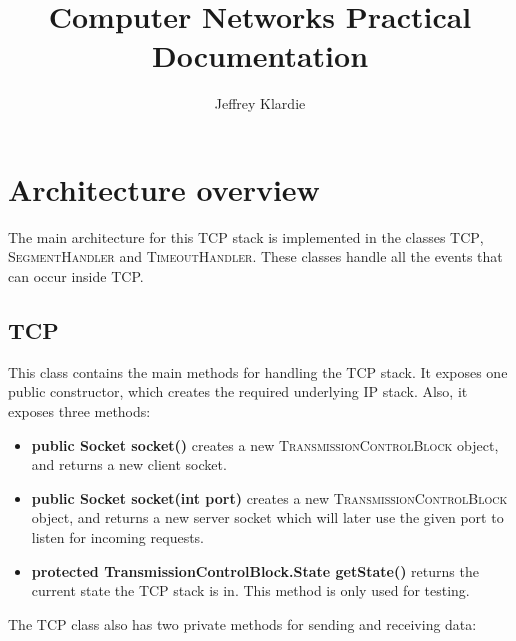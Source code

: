 \documentclass{hitec}
\title{Computer Networks Practical Documentation}
\author{Jeffrey Klardie}
\newcommand{\classname}[1]{\textsc{#1}}
\begin{document}
\maketitle

\section{Architecture overview}
The main architecture for this TCP stack is implemented in the classes \classname{TCP}, \classname{SegmentHandler} and \classname{TimeoutHandler}. These classes handle all the events that can occur inside TCP.

\subsection{TCP}
This class contains the main methods for handling the TCP stack. It exposes one public constructor, which creates the required underlying IP stack. Also, it exposes three methods:

\begin{itemize}
 \item \textbf{public Socket socket()} creates a new \classname{TransmissionControlBlock} object, and returns a new client socket.
 \item \textbf{public Socket socket(int port)} creates a new \classname{TransmissionControlBlock} object, and returns a new server socket which will later use the given port to listen for incoming requests.
 \item \textbf{protected TransmissionControlBlock.State getState()} returns the current state the TCP stack is in. This method is only used for testing. 
\end{itemize}

The \classname{TCP} class also has two private methods for sending and receiving data:
\end{document}
